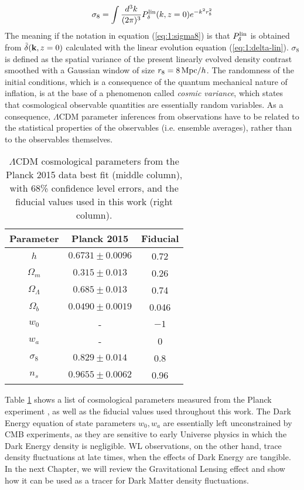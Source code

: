 \begin{equation}
\label{eq:1:sigma8}
\sigma_8 = \int \frac{d^3k}{(2\pi)^3} P^{\rm lin}_\delta(k,z=0)e^{-k^2 r_8^2}
\end{equation} 
%
The meaning if the notation in equation (\ref{eq:1:sigma8}) is that $P_\delta^{\rm lin}$ is obtained from $\tilde{\delta}(\mathbf{k},z=0)$ calculated with the linear evolution equation (\ref{eq:1:delta-lin}). $\sigma_8$ is defined as the spatial variance of the present linearly evolved density contrast smoothed with a Gaussian window of size $r_8=8\,{\rm Mpc}/h$. The randomness of the initial conditions, which is a consequence of the quantum mechanical nature of inflation, is at the base of a phenomenon called \textit{cosmic variance}, which states that cosmological observable quantities are essentially random variables. As a consequence, $\Lambda$CDM parameter inferences from observations have to be related to the statistical properties of the observables (i.e. ensemble averages), rather than to the observables themselves. 
%
\begin{table}
\begin{center}
\begin{tabular}[h]{c|c|c}

\textbf{Parameter} & \textbf{Planck 2015} & \textbf{Fiducial} \\ \hline 

$h$ & $0.6731\pm 0.0096$ & 0.72 \\
$\Omega_m$ & $0.315\pm 0.013$ & 0.26 \\
$\Omega_\Lambda$ & $0.685\pm 0.013$ & 0.74 \\
$\Omega_b$ & $0.0490\pm 0.0019$ & 0.046 \\
$w_0$ & - & $-1$ \\
$w_a$ & - & 0 \\
$\sigma_8$ & $0.829\pm0.014$ & 0.8 \\
$n_s$ & $0.9655\pm 0.0062$ & 0.96 \\

\end{tabular}
\end{center}
\caption{$\Lambda$CDM cosmological parameters from the Planck 2015 \citep{Planck15} data best fit (middle column), with 68\% confidence level errors, and the fiducial values used in this work (right column).}
\label{tab:1:cosmopar}
\end{table}
%
Table \ref{tab:1:cosmopar} shows a list of cosmological parameters measured from the Planck experiment \citep{Planck15}, as well as the fiducial values used throughout this work. The Dark Energy equation of state parameters $w_0,w_a$ are essentially left unconstrained by CMB experiments, as they are sensitive to early Universe physics in which the Dark Energy density is negligible. WL observations, on the other hand, trace density fluctuations at late times, when the effects of Dark Energy are tangible. In the next Chapter, we will review the Gravitational Lensing effect and show how it can be used as a tracer for Dark Matter density fluctuations. 

%